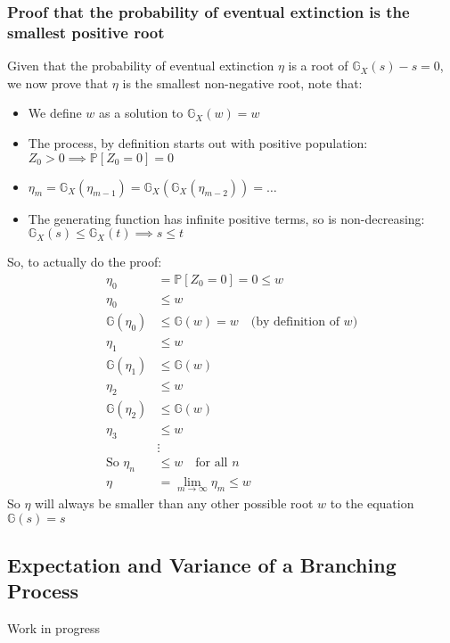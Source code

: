 \documentclass[12pt]{report}
\begin{document}
\subsubsection{Proof that the probability of eventual extinction is the
smallest positive root}
Given that the probability of eventual extinction $\eta$ is a root of $
\mathbb{G}_X(s) - s = 0$, we now prove that $\eta$ is the smallest non-negative
root, note that:
\begin{itemize}
    \item We define $w$ as a solution to $ \mathbb{G}_X(w) = w $
    \item The process, by definition starts out with positive population:
        $Z_{0} > 0 \implies \mathbb{P}\left[Z_{0} = 0\right] = 0$
    \item $\eta_{m} = \mathbb{G}_X(\eta_{m-1}) =
        \mathbb{G}_X(\mathbb{G}_X(\eta_{m-2})) = \dots $
    \item The generating function has infinite positive terms, so
        is non-decreasing: $\mathbb{G}_X(s) \le \mathbb{G}_X(t) \implies s \le t$
\end{itemize}
So, to actually do the proof:
\begin{equation*}
    \begin{aligned}
        \eta_{0} &= \mathbb{P}\left[Z_{0} = 0\right] = 0 \le w \\
        \eta_{0} &\le w \\
        \mathbb{G}(\eta_{0}) &\le \mathbb{G}(w) = w \quad\text{(by definition
        of $w$)} \\
        \eta_{1} &\le w \\
        \mathbb{G}(\eta_{1}) &\le \mathbb{G}(w) \\
        \eta_{2} &\le w \\
        \mathbb{G}(\eta_{2}) &\le \mathbb{G}(w) \\
        \eta_{3} &\le w \\
                             &\vdots\\
        \text{So } \eta_{n} &\le w \quad \text{for all } n\\
        \eta &= \lim_{m \to \infty} \eta_{m} \le w
    \end{aligned}
\end{equation*}
So $\eta$ will always be smaller than any other possible root $w$ to the
equation $ \mathbb{G}(s) = s$

\subsection{Expectation and Variance of a Branching Process}
Work in progress
\end{document}
